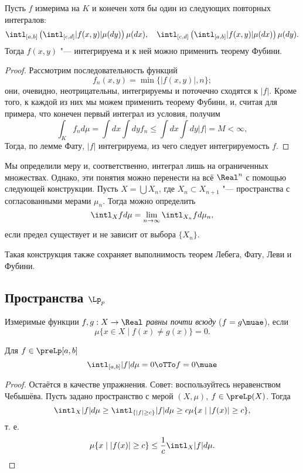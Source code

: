 \documentclass[main]{subfiles}
\begin{document}
\begin{corollary}
  Пусть \( f \) измерима на \( K \)
  и конечен хотя бы
  один из следующих повторных интегралов:
  \[
    \intl_{[a, b]} \left( \intl_{[c, d]} |f(x, y)| \mu(dy) \right) \mu(dx),
    \quad
    \intl_{[c, d]} \left( \intl_{[a, b]} |f(x, y)| \mu(dx) \right) \mu(dy).
  \]
  Тогда \( f(x, y) \) "--- интегрируема
  и к ней можно применить теорему Фубини.
\end{corollary}
\begin{proof}
  Рассмотрим последовательность функций
  \[
    f_n(x, y) = \min \{ |f(x, y)|, n \};
  \]
  они, очевидно, неотрицательны, интегрируемы 
  и поточечно сходятся к \( |f| \). Кроме того,
  к каждой из них мы можем применить теорему Фубини,
  и, считая для примера,
  что конечен первый интеграл из условия,
  получим
  \[
    \int_K f_n d \mu =
    \int dx \int dy f_n \le \int dx \int dy |f| = M < \infty,
  \]
  Тогда, по лемме Фату, \( |f| \) интегрируема,
  из чего следует интегрируемость \( f \).
\end{proof}

Мы определили меру и, соответственно, интеграл
лишь на ограниченных множествах.
Однако, эти понятия можно перенести
на всё \( \Real^n \) с помощью следующей конструкции.
Пусть \( X = \bigcup X_n \), где
\( X_n \subset X_{n+1} \) "--- пространства
с согласованными мерами \( \mu_n \).
Тогда можно определить
\[
  \intl_X f d\mu = \lim_{n \to \infty} \intl_{X_n} f d\mu_n,
\]
если предел существует и не зависит от выбора \( \{ X_n \} \).

\begin{remark}
  Такая конструкция также сохраняет выполнимость теорем
  Лебега, Фату, Леви и Фубини.
\end{remark}

\subsection{Пространства \( \Lp_p \)}

\begin{definition}
  Измеримые функции \( f, g : X \to \Real \)
  \emph{равны почти всюду} (\( f = g \muae \)),
  если
  \[
    \mu \{ x \in X \mid f(x) \ne g(x) \} = 0.
  \]
\end{definition}

\begin{proposition}
  Для \( f \in \preLp[a, b] \)
  \[
    \intl_{[a,b]} |f| d \mu = 0 \oTTo
    f = 0 \muae
  \]
\end{proposition}
\begin{proof}
  Остаётся в качестве упражнения.
  Совет: воспользуйтесь неравенством Чебышёва.
  Пусть задано пространство с мерой \( (X, \mu) \),
  \( f \in \preLp(X) \). Тогда
  \[
    \intl_X |f| d \mu \ge
    \intl_{\{ |f| \ge c \}} |f| d \mu
    \ge c \mu \{ x \mid |f(x)| \ge c \},
  \]
  т. е.
  \[
    \mu\{ x \mid |f(x)| \ge c \}
    \le \frac1c \intl_X |f| d\mu.
  \]
\end{proof}
\end{document}
